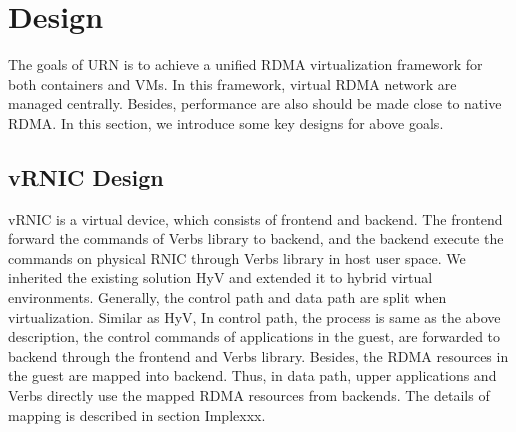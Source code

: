 \section{Design}

The goals of URN is to achieve a unified RDMA virtualization framework for both containers and VMs. In this framework, virtual RDMA network are managed centrally. Besides, performance are also should be made close to native RDMA. In this section, we introduce some key designs for above goals.


\subsection{vRNIC Design}

vRNIC is a virtual device, which consists of frontend and backend. The frontend forward the commands of Verbs library to backend, and the backend execute the commands on physical RNIC through Verbs library in host user space. We inherited the existing solution HyV and extended it to hybrid virtual environments. Generally, the control path and data path are split when virtualization. Similar as HyV, In control path, the process is same as the above description, the control commands of applications in the guest, are forwarded to backend through the frontend and Verbs library. Besides, the RDMA resources in the guest are mapped into backend. Thus, in data path, upper applications and Verbs directly use the mapped RDMA resources from backends. The details of mapping is described in section Implexxx.

